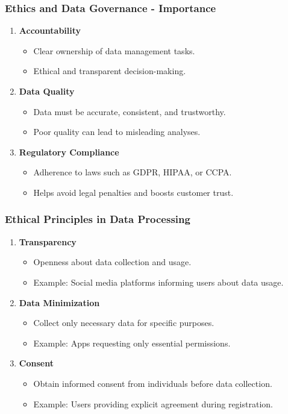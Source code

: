\documentclass[aspectratio=169]{beamer}
\begin{document}
\begin{frame}[fragile]
    \frametitle{Ethics and Data Governance - Importance}
    \begin{enumerate}
        \item \textbf{Accountability}
        \begin{itemize}
            \item Clear ownership of data management tasks.
            \item Ethical and transparent decision-making.
        \end{itemize}

        \item \textbf{Data Quality}
        \begin{itemize}
            \item Data must be accurate, consistent, and trustworthy.
            \item Poor quality can lead to misleading analyses.
        \end{itemize}

        \item \textbf{Regulatory Compliance}
        \begin{itemize}
            \item Adherence to laws such as GDPR, HIPAA, or CCPA.
            \item Helps avoid legal penalties and boosts customer trust.
        \end{itemize}
    \end{enumerate}
\end{frame}

\begin{frame}[fragile]
    \frametitle{Ethical Principles in Data Processing}
    \begin{enumerate}
        \item \textbf{Transparency}
        \begin{itemize}
            \item Openness about data collection and usage.
            \item Example: Social media platforms informing users about data usage.
        \end{itemize}

        \item \textbf{Data Minimization}
        \begin{itemize}
            \item Collect only necessary data for specific purposes.
            \item Example: Apps requesting only essential permissions.
        \end{itemize}

        \item \textbf{Consent}
        \begin{itemize}
            \item Obtain informed consent from individuals before data collection.
            \item Example: Users providing explicit agreement during registration.
        \end{itemize}
    \end{enumerate}
\end{frame}
\end{document}
